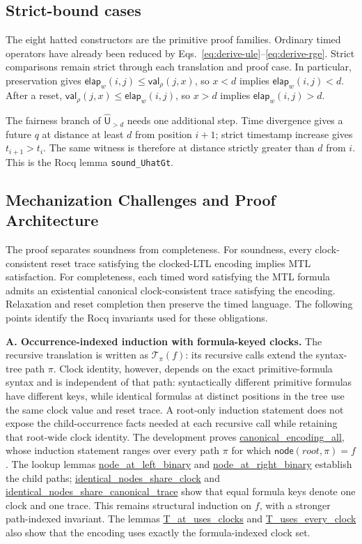 \documentclass[10pt,journal,compsoc]{IEEEtran}
\newcommand{\hUntil}{\mathbin{\widehat{\mathsf{U}}}}
\newcommand{\T}{\mathcal{T}}
\newcommand{\Node}{\mathsf{node}}
\newcommand{\CVal}{\mathsf{val}}
\newcommand{\elapsed}{\mathsf{elap}}
\newcommand{\runinhead}[1]{\par\smallskip\noindent\textbf{#1}\enspace}
\newcommand{\Rocqid}[1]{{\small\url{#1}}}
\begin{document}
\subsection{Strict-bound cases}
\label{subsec:main-strict-bounds}
The eight hatted constructors are the primitive proof families. Ordinary
timed operators have already been reduced by
Eqs.~\eqref{eq:derive-ule}--\eqref{eq:derive-rge}. Strict comparisons remain
strict through each translation and proof case. In particular, preservation
gives $\elapsed_w(i,j)\le\CVal_\rho(j,x)$, so $x<d$ implies
$\elapsed_w(i,j)<d$. After a reset,
$\CVal_\rho(j,x)\le\elapsed_w(i,j)$, so $x>d$ implies
$\elapsed_w(i,j)>d$.

The fairness branch of $\hUntil_{>d}$ needs one additional step. Time
divergence gives a future $q$ at distance at least $d$ from position $i+1$;
strict timestamp increase gives $t_{i+1}>t_i$. The same witness is therefore
at distance strictly greater than $d$ from $i$. This is the Rocq lemma
\texttt{sound\_UhatGt}.

\subsection{Mechanization Challenges and Proof Architecture}
\label{subsec:mechanization-challenges}
The proof separates soundness from completeness. For soundness, every
clock-consistent reset trace satisfying the clocked-LTL encoding implies MTL
satisfaction. For completeness, each timed word satisfying the MTL formula
admits an existential canonical clock-consistent trace satisfying the
encoding. Relaxation and reset completion then preserve the timed language.
The following points identify the Rocq invariants used for these obligations.

\runinhead{A. Occurrence-indexed induction with formula-keyed clocks.}
The recursive translation is written as $\T_\pi(f)$: its recursive calls
extend the syntax-tree path $\pi$. Clock identity, however, depends on the
exact primitive-formula syntax and is independent of that path: syntactically
different primitive formulas have different keys, while identical formulas
at distinct positions in the tree use the same clock value and reset trace.
A root-only induction statement does not expose the
child-occurrence facts needed at each recursive call while retaining that
root-wide clock identity. The development proves
\Rocqid{canonical_encoding_all}, whose induction statement ranges over
every path $\pi$ for which $\Node(\mathit{root},\pi)=f$. The lookup lemmas
\Rocqid{node_at_left_binary} and \Rocqid{node_at_right_binary}
establish the child paths; \Rocqid{identical_nodes_share_clock} and
\Rocqid{identical_nodes_share_canonical_trace} show that equal
formula keys denote one clock and one trace. This remains structural
induction on $f$, with a stronger path-indexed invariant. The lemmas
\Rocqid{T_at_uses_clocks} and \Rocqid{T_uses_every_clock} also show
that the encoding uses exactly the formula-indexed clock set.
\end{document}

